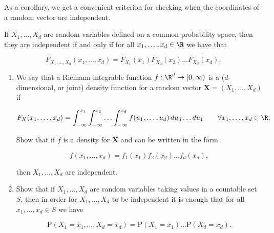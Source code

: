 \noindent As a corollary, we get a convenient criterion for
checking when the coordinates of a random vector are
independent.

\begin{lem}
If $X_1,\ldots,X_d$ are random variables defined on a
common probability space, then they are independent if
and only if for all $x_1,\ldots,x_d \in \R$ we have
that

\[
F_{X_1,\ldots,X_d}(x_1,\ldots,x_d) = F_{X_1}(x_1) F_{X_2}(x_2) \ldots F_{X_d}(x_d).
\]

\end{lem}

\begin{xexercise}

\begin{enumerate}[label=(\roman*)]
\item We say that a Riemann-integrable function
$f:\R^d\to[0,\infty)$ is a ($d$-dimensional, or
joint) density function for a random vector
$\mathbf{X}=(X_1,\ldots,X_d)$ if

\[
F_X(x_1,\ldots,x_d) = \int_{-\infty}^{x_1} \int_{-\infty}^{x_2} \ldots \int_{-\infty}^{x_d}
f(u_1,\ldots,u_d)\,du_d\ldots du_1 \qquad \forall x_1,\ldots,x_d \in \R.
\]

\noindent Show that if $f$ is a density for $\mathbf{X}$ and
can be written in the form

\[
f(x_1,\ldots,x_d) = f_1(x_1) f_2(x_2) \ldots f_d(x_d),
\]

\noindent then $X_1,\ldots,X_d$ are independent.

\item Show that if $X_1,\ldots,X_d$ are random variables
taking values in a countable set $S$, then in order
for $X_1,\ldots,X_d$ to be independent it is enough
that for all $x_1,\ldots,x_d\in S$ we have

\[
\mathrm{P}(X_1=x_1,\ldots,X_d = x_d) = \mathrm{P}(X_1=x_1)\ldots \mathrm{P}(X_d=x_d).
\]
\end{enumerate}

\end{xexercise}
